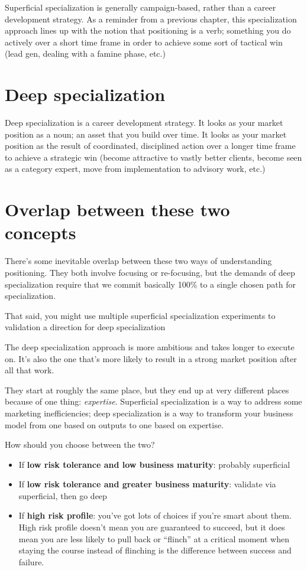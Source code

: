 Superficial specialization is generally campaign-based, rather than a career development strategy. As a reminder from a previous chapter, this specialization approach lines up with the notion that positioning is a verb; something you do actively over a short time frame in order to achieve some sort of tactical win (lead gen, dealing with a famine phase, etc.)

\section{Deep specialization}

Deep specialization is a career development strategy. It looks as your market position as a noun; an asset that you build over time. It looks as your market position as the result of coordinated, disciplined action over a longer time frame to achieve a strategic win (become attractive to vastly better clients, become seen as a category expert, move from implementation to advisory work, etc.)

\section{Overlap between these two concepts}

There's some inevitable overlap between these two ways of understanding positioning. They both involve focusing or re-focusing, but the demands of deep specialization require that we commit basically 100\% to a single chosen path for specialization.

That said, you might use multiple superficial specialization experiments to validation a direction for deep specialization

The deep specialization approach is more ambitious and takes longer to execute on. It's also the one that's more likely to result in a strong market position after all that work.

They start at roughly the same place, but they end up at very different places because of one thing: \emph{expertise}. Superficial specialization is a way to address some marketing inefficiencies; deep specialization is a way to transform your business model from one based on outputs to one based on expertise.

How should you choose between the two?

\begin{itemize}
\item If \textbf{low risk tolerance and low business maturity}: probably superficial
\item If \textbf{low risk tolerance and greater business maturity}: validate via superficial, then go deep
\item If \textbf{high risk profile}: you've got lots of choices if you're smart about them. High risk profile doesn't mean you are guaranteed to succeed, but it does mean you are less likely to pull back or ``flinch'' at a critical moment when staying the course instead of flinching is the difference between success and failure.
\end{itemize}


